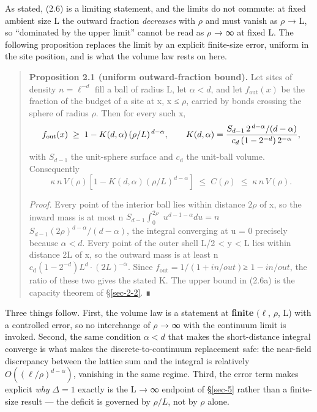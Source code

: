 \documentclass[aps,prd,preprint,nofootinbib,superscriptaddress]{revtex4-2}
\begin{document}
As stated, (2.6) is a limiting statement, and the limits do not commute:
at fixed ambient size L the outward fraction \emph{decreases} with
\(\rho\) and must vanish as \(\rho\) → L, so ``dominated by the upper
limit'' cannot be read as \(\rho\) → ∞ at fixed L. The following
proposition replaces the limit by an explicit finite-size error, uniform
in the site position, and is what the volume law rests on here.

\begin{quote}
\textbf{Proposition 2.1 (uniform outward-fraction bound).} Let sites of
density \(n = \ell ^{-d}\) fill a ball of radius L, let \(\alpha  < d\),
and let \(f_{\mathrm{out}}(x)\) be the fraction of the budget of a site
at x, \textbar x\textbar{} ≤ \(\rho\), carried by bonds crossing the
sphere of radius \(\rho\). Then for every such x,
\begin{equation}f_{\rm out}(x) \;\ge\; 1 - K(d,\alpha)\,(\rho/L)^{\,d-\alpha}, \qquad
K(d,\alpha) = \frac{S_{d-1}\,2^{\,d-\alpha}/(d-\alpha)}{c_d\,(1-2^{-d})\,2^{-\alpha}},\end{equation}
with \(S_{d-1}\) the unit-sphere surface and \(c_{\mathrm{d}}\) the
unit-ball volume. Consequently
\begin{equation}\kappa\,n\,V(\rho)\left[1 - K(d,\alpha)(\rho/L)^{d-\alpha}\right] \;\le\; C(\rho) \;\le\; \kappa\,n\,V(\rho). \tag{2.6a}\end{equation}

\emph{Proof.} Every point of the interior ball lies within distance
\(2\rho\) of x, so the inward mass is at most n
\(S_{d-1}\)\(∫_{0}^{2\rho }\) \(u^{d-1-\alpha }du = n\)
\(S_{d-1}(2\rho )^{d-\alpha }/(d-\alpha )\), the integral converging at
u = 0 precisely because \(\alpha  < d\). Every point of the outer shell
L/2 \textless{} \textbar y\textbar{} \textless{} L lies within distance
2L of x, so the outward mass is at least n
\(c_{\mathrm{d}}(1-2^{-d})L^{d}\cdot (2L)^{-\alpha }\). Since
\(f_{\mathrm{out}} = 1/(1 + in/out)\)≥ \(1 - in/out\), the ratio of
these two gives the stated K. The upper bound in (2.6a) is the capacity
theorem of §\ref{sec-2-2}. ∎
\end{quote}

Three things follow. First, the volume law is a statement at
\textbf{finite} \((\ell\), \(\rho\), L) with a controlled error, so no
interchange of \(\rho\) → ∞ with the continuum limit is invoked. Second,
the same condition \(\alpha  < d\) that makes the short-distance
integral converge is what makes the discrete-to-continuum replacement
safe: the near-field discrepancy between the lattice sum and the
integral is relatively \(O((\ell /\rho )^{d-\alpha })\), vanishing in
the same regime. Third, the error term makes explicit \emph{why}
\(\Delta  = 1\) exactly is the L → ∞ endpoint of §\ref{sec-5} rather
than a finite-size result --- the deficit is governed by \(\rho /L\),
not by \(\rho\) alone.
\end{document}
